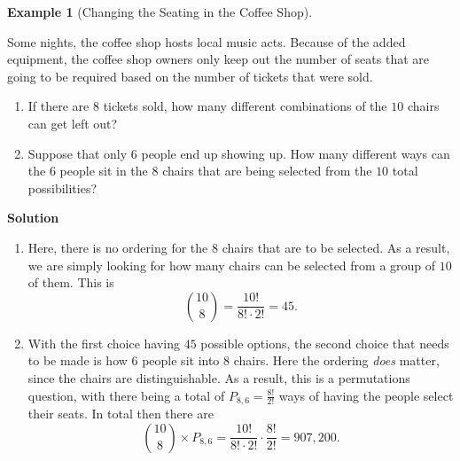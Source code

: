 \documentclass[
  letterpaper,
  DIV=11,
  numbers=noendperiod]{scrreprt}
\providecommand{\tightlist}{%
  \setlength{\itemsep}{0pt}\setlength{\parskip}{0pt}}\usepackage{longtable,booktabs,array}
\theoremstyle{definition}
\theoremstyle{definition}
\theoremstyle{definition}
\newtheorem{example}{Example}[chapter]
\theoremstyle{remark}
\begin{document}
\begin{example}[Changing the Seating in the Coffee
Shop]\protect\hypertarget{exm-combinations}{}\label{exm-combinations}

Some nights, the coffee shop hosts local music acts. Because of the
added equipment, the coffee shop owners only keep out the number of
seats that are going to be required based on the number of tickets that
were sold.

\begin{enumerate}
\def\labelenumi{\alph{enumi}.}
\tightlist
\item
  If there are \(8\) tickets sold, how many different combinations of
  the \(10\) chairs can get left out?
\item
  Suppose that only \(6\) people end up showing up. How many different
  ways can the \(6\) people sit in the \(8\) chairs that are being
  selected from the \(10\) total possibilities?
\end{enumerate}

\begin{tcolorbox}[enhanced jigsaw, colback=white, breakable, rightrule=.15mm, leftrule=.75mm, toprule=.15mm, left=2mm, arc=.35mm, opacityback=0, bottomrule=.15mm]

\vspace{-3mm}\textbf{Solution}\vspace{3mm}

\begin{enumerate}
\def\labelenumi{\alph{enumi}.}
\item
  Here, there is no ordering for the \(8\) chairs that are to be
  selected. As a result, we are simply looking for how many chairs can
  be selected from a group of \(10\) of them. This is
  \[\binom{10}{8} = \frac{10!}{8!\cdot 2!} = 45.\]
\item
  With the first choice having \(45\) possible options, the second
  choice that needs to be made is how \(6\) people sit into \(8\)
  chairs. Here the ordering \emph{does} matter, since the chairs are
  distinguishable. As a result, this is a permutations question, with
  there being a total of \(P_{8,6} = \frac{8!}{2!}\) ways of having the
  people select their seats. In total then there are
  \[\binom{10}{8}\times P_{8,6} = \frac{10!}{8!\cdot 2!}\cdot\frac{8!}{2!} = 907,200.\]
\end{enumerate}

\end{tcolorbox}

\end{example}
\end{document}
